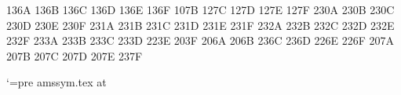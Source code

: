 \newsymbol{}
\newsymbol{}
\newsymbol{}
\newsymbol{}
\newsymbol{}
 \let\doublecup\Cup
\newsymbol{}
 \let\doublecap\Cap
\newsymbol{}
\newsymbol{}
\newsymbol{}
\newsymbol{}
\newsymbol\subseteqq 136A
\newsymbol\supseteqq 136B
\newsymbol\bumpeq 136C
\newsymbol\Bumpeq 136D
\newsymbol\lll 136E
 \let\llless\lll
\newsymbol\ggg 136F
 \let\gggtr\ggg
\newsymbol{}
\newsymbol{}
\newsymbol{}
\newsymbol{}
\newsymbol{}
\newsymbol\complement 107B
\newsymbol\intercal 127C
\newsymbol\circledcirc 127D
\newsymbol\circledast 127E
\newsymbol\circleddash 127F
\newsymbol{}
\newsymbol{}
\newsymbol{}
\newsymbol{}
\newsymbol{}
\newsymbol{}
\newsymbol{}
\newsymbol{}
\newsymbol{}
\newsymbol{}
\newsymbol\nleqslant 230A
\newsymbol\ngeqslant 230B
\newsymbol\lneq 230C
\newsymbol\gneq 230D
\newsymbol\npreceq 230E
\newsymbol\nsucceq 230F
\newsymbol{}
\newsymbol{}
\newsymbol{}
\newsymbol{}
\newsymbol{}
\newsymbol{}
\newsymbol{}
\newsymbol{}
\newsymbol{}
\newsymbol{}
\newsymbol\lnapprox 231A
\newsymbol\gnapprox 231B
\newsymbol\nsim 231C
\newsymbol\ncong 231D
\newsymbol\diagup 231E
\newsymbol\diagdown 231F
\newsymbol{}
\newsymbol{}
\newsymbol{}
\newsymbol{}
\newsymbol{}
\newsymbol{}
\newsymbol{}
\newsymbol{}
\newsymbol{}
\newsymbol{}
\newsymbol\nsubseteq 232A
\newsymbol\nsupseteq 232B
\newsymbol\nparallel 232C
\newsymbol\nmid 232D
\newsymbol\nshortmid 232E
\newsymbol\nshortparallel 232F
\newsymbol{}
\newsymbol{}
\newsymbol{}
\newsymbol{}
\newsymbol{}
\newsymbol{}
\newsymbol{}
\newsymbol{}
\newsymbol{}
\newsymbol{}
\newsymbol\nLeftarrow 233A
\newsymbol\nRightarrow 233B
\newsymbol\nLeftrightarrow 233C
\newsymbol\nleftrightarrow 233D
\newsymbol\divideontimes 223E
\newsymbol\varnothing 203F
\newsymbol{}
\newsymbol{}
\newsymbol{}
\newsymbol{}
\newsymbol{}
\newsymbol{}
\newsymbol{}
\newsymbol\gimel 206A
\newsymbol\daleth 206B
\newsymbol\lessdot 236C
\newsymbol\gtrdot 236D
\newsymbol\ltimes 226E
\newsymbol\rtimes 226F
\newsymbol{}
\newsymbol{}
\newsymbol{}
\newsymbol{}
\newsymbol{}
\newsymbol{}
\newsymbol{}
\newsymbol{}
\newsymbol{}
\newsymbol{}
\newsymbol\digamma 207A
\newsymbol\varkappa 207B
\newsymbol\Bbbk 207C
\newsymbol\hslash 207D
\undefine\hbar
\newsymbol\hbar 207E
\newsymbol\backepsilon 237F


\catcode`\@=\csname pre amssym.tex at\endcsname

\endinput
